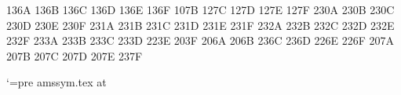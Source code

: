 \newsymbol{}
\newsymbol{}
\newsymbol{}
\newsymbol{}
\newsymbol{}
 \let\doublecup\Cup
\newsymbol{}
 \let\doublecap\Cap
\newsymbol{}
\newsymbol{}
\newsymbol{}
\newsymbol{}
\newsymbol\subseteqq 136A
\newsymbol\supseteqq 136B
\newsymbol\bumpeq 136C
\newsymbol\Bumpeq 136D
\newsymbol\lll 136E
 \let\llless\lll
\newsymbol\ggg 136F
 \let\gggtr\ggg
\newsymbol{}
\newsymbol{}
\newsymbol{}
\newsymbol{}
\newsymbol{}
\newsymbol\complement 107B
\newsymbol\intercal 127C
\newsymbol\circledcirc 127D
\newsymbol\circledast 127E
\newsymbol\circleddash 127F
\newsymbol{}
\newsymbol{}
\newsymbol{}
\newsymbol{}
\newsymbol{}
\newsymbol{}
\newsymbol{}
\newsymbol{}
\newsymbol{}
\newsymbol{}
\newsymbol\nleqslant 230A
\newsymbol\ngeqslant 230B
\newsymbol\lneq 230C
\newsymbol\gneq 230D
\newsymbol\npreceq 230E
\newsymbol\nsucceq 230F
\newsymbol{}
\newsymbol{}
\newsymbol{}
\newsymbol{}
\newsymbol{}
\newsymbol{}
\newsymbol{}
\newsymbol{}
\newsymbol{}
\newsymbol{}
\newsymbol\lnapprox 231A
\newsymbol\gnapprox 231B
\newsymbol\nsim 231C
\newsymbol\ncong 231D
\newsymbol\diagup 231E
\newsymbol\diagdown 231F
\newsymbol{}
\newsymbol{}
\newsymbol{}
\newsymbol{}
\newsymbol{}
\newsymbol{}
\newsymbol{}
\newsymbol{}
\newsymbol{}
\newsymbol{}
\newsymbol\nsubseteq 232A
\newsymbol\nsupseteq 232B
\newsymbol\nparallel 232C
\newsymbol\nmid 232D
\newsymbol\nshortmid 232E
\newsymbol\nshortparallel 232F
\newsymbol{}
\newsymbol{}
\newsymbol{}
\newsymbol{}
\newsymbol{}
\newsymbol{}
\newsymbol{}
\newsymbol{}
\newsymbol{}
\newsymbol{}
\newsymbol\nLeftarrow 233A
\newsymbol\nRightarrow 233B
\newsymbol\nLeftrightarrow 233C
\newsymbol\nleftrightarrow 233D
\newsymbol\divideontimes 223E
\newsymbol\varnothing 203F
\newsymbol{}
\newsymbol{}
\newsymbol{}
\newsymbol{}
\newsymbol{}
\newsymbol{}
\newsymbol{}
\newsymbol\gimel 206A
\newsymbol\daleth 206B
\newsymbol\lessdot 236C
\newsymbol\gtrdot 236D
\newsymbol\ltimes 226E
\newsymbol\rtimes 226F
\newsymbol{}
\newsymbol{}
\newsymbol{}
\newsymbol{}
\newsymbol{}
\newsymbol{}
\newsymbol{}
\newsymbol{}
\newsymbol{}
\newsymbol{}
\newsymbol\digamma 207A
\newsymbol\varkappa 207B
\newsymbol\Bbbk 207C
\newsymbol\hslash 207D
\undefine\hbar
\newsymbol\hbar 207E
\newsymbol\backepsilon 237F


\catcode`\@=\csname pre amssym.tex at\endcsname

\endinput
